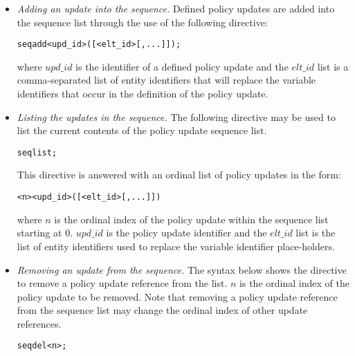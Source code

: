 \documentclass[glov2,twocolumn,final]{svjour2}
\newenvironment{vverbatim}
  {\begin{alltt}}
  {\vspace{-\baselineskip}\end{alltt}}
\begin{document}
        \begin{itemize}
          \item
            {\em Adding an update into the sequence.}
            Defined policy updates are added into the sequence list through the
            use of the following directive:

            \begin{vverbatim}
  seq add <upd\_id>([<elt\_id>[, ...]]);
            \end{vverbatim}

            \noindent where $upd\_id$ is the identifier of a defined policy
            update and the $elt\_id$ list is a comma-separated list of entity
            identifiers that will replace the variable identifiers that occur
            in the definition of the policy update.

          \item
            {\em Listing the updates in the sequence.}
            The following directive may be used to list the current contents of
            the policy update sequence list.

            \begin{vverbatim}
  seq list;
            \end{vverbatim}

            This directive is answered with an ordinal list of policy updates
            in the form:

            \begin{vverbatim}
  <n> <upd\_id>([<elt\_id>[, ...]])
            \end{vverbatim}

            \noindent where $n$ is the ordinal index of the policy update
            within the sequence list starting at 0. $upd\_id$ is the policy
            update identifier and the $elt\_id$ list is the list of entity
            identifiers used to replace the variable identifier place-holders.

          \item
            {\em Removing an update from the sequence.}
            The syntax below shows the directive to remove a policy update
            reference from the list. $n$ is the ordinal index of the policy
            update to be removed. Note that removing a policy update reference
            from the sequence list may change the ordinal index of other update
            references.

            \begin{vverbatim}
  seq del <n>;
            \end{vverbatim}


\end{itemize}
\end{document}
